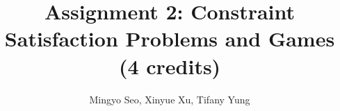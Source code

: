 \documentclass[10pt,letterpaper]{article}
\begin{document}
\setlength{\parskip}{1em}

\title{Assignment 2: Constraint Satisfaction Problems and Games (4 credits)}
\author{Mingyo Seo, Xinyue Xu, Tifany Yung}
\maketitle




\end{document}
